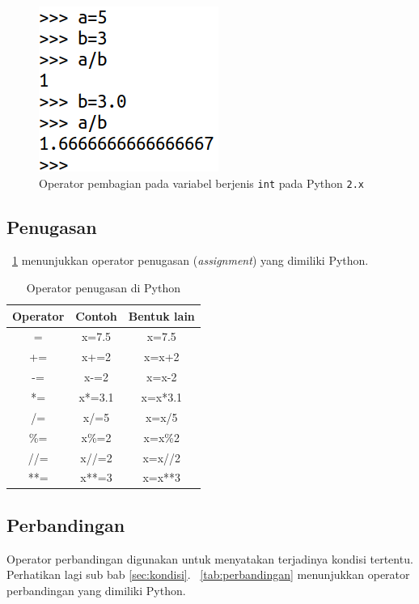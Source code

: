 \begin{figure}
  \begin{center}
    \includegraphics[scale=2.0]{pics/pembagian2.png}
    \caption{Operator pembagian pada variabel berjenis \texttt{int} pada Python \texttt{2.x}}
    \label{fig:pembagian2}
  \end{center}
\end{figure}

\subsection{Penugasan}
\tablename~\ref{tab:assignment} menunjukkan operator penugasan (\textit{assignment}) yang dimiliki Python.

\begin{table}[h]
\caption{Operator penugasan di Python}
\label{tab:assignment}
  \begin{center}
    \begin{tabular}{@{}ccc@{}}\toprule
    Operator & Contoh & Bentuk lain\\ \midrule
    = & x=7.5 & x=7.5\\
    += & x+=2 & x=x+2 \\
    -= & x-=2 & x=x-2\\
    *= & x*=3.1 & x=x*3.1\\
    /= & x/=5 & x=x/5\\
    \%= & x\%=2 & x=x\%2\\
    //= & x//=2 & x=x//2\\
    **= & x**=3 & x=x**3\\
       \bottomrule
    \end{tabular}
  \end{center}
\end{table}

\subsection{Perbandingan}
Operator perbandingan digunakan untuk menyatakan terjadinya kondisi tertentu. Perhatikan lagi sub bab \ref{sec:kondisi}. \tablename~\ref{tab:perbandingan} menunjukkan operator perbandingan yang dimiliki Python. 

